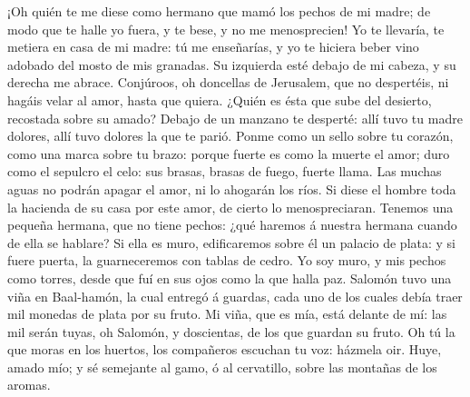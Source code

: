  ¡Oh quién te me diese como hermano que mamó los pechos de
mi madre; de modo que te halle yo fuera, y te bese, y no me
menosprecien!  Yo te llevaría, te metiera en casa de mi
madre: tú me enseñarías, y yo te hiciera beber vino adobado del mosto de
mis granadas.  Su izquierda esté debajo de mi cabeza, y su
derecha me abrace.  Conjúroos, oh doncellas de Jerusalem,
que no despertéis, ni hagáis velar al amor, hasta que quiera.
 ¿Quién es ésta que sube del desierto, recostada sobre su
amado? Debajo de un manzano te desperté: allí tuvo tu madre dolores,
allí tuvo dolores la que te parió.  Ponme como un sello
sobre tu corazón, como una marca sobre tu brazo: porque fuerte es como
la muerte el amor; duro como el sepulcro el celo: sus brasas, brasas de
fuego, fuerte llama.  Las muchas aguas no podrán apagar el
amor, ni lo ahogarán los ríos. Si diese el hombre toda la hacienda de su
casa por este amor, de cierto lo menospreciaran.  Tenemos
una pequeña hermana, que no tiene pechos: ¿qué haremos á nuestra hermana
cuando de ella se hablare?  Si ella es muro, edificaremos
sobre él un palacio de plata: y si fuere puerta, la guarneceremos con
tablas de cedro.  Yo soy muro, y mis pechos como torres,
desde que fuí en sus ojos como la que halla paz.  Salomón
tuvo una viña en Baal-hamón, la cual entregó á guardas, cada uno de los
cuales debía traer mil monedas de plata por su fruto.  Mi
viña, que es mía, está delante de mí: las mil serán tuyas, oh Salomón, y
doscientas, de los que guardan su fruto.  Oh tú la que
moras en los huertos, los compañeros escuchan tu voz: házmela oir.
 Huye, amado mío; y sé semejante al gamo, ó al
cervatillo, sobre las montañas de los aromas.
